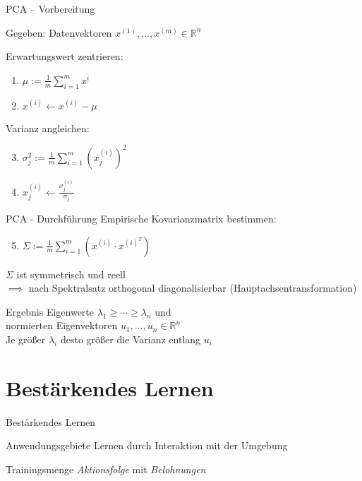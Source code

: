 \documentclass[xcolor={dvipsnames,svgnames}]{beamer}
\begin{document}
\begin{frame}{PCA -- Vorbereitung}

  Gegeben: Datenvektoren $x^{(1)},\ldots,x^{(m)} \in \mathbb{R}^n$
  \vspace{1em}

  Erwartungswert zentrieren:
  
  \begin{enumerate}
  \item $\mu := \frac{1}{m}\sum_{i=1}^m x^{i}$
  \item $x^{(i)} \leftarrow x^{(i)} - \mu$
  \end{enumerate}

  Varianz angleichen:

  \begin{enumerate}
  \setcounter{enumi}{2}
  \item $\sigma_j^2 := \frac{1}{m}\sum_{i=1}^m{(x_j^{(i)})}^2$
  \item $x_j^{(i)} \leftarrow \frac{x_j^{(i)}}{\sigma_j}$
  \end{enumerate}

\end{frame}

\begin{frame}{PCA - Durchführung}
  Empirische Kovarianzmatrix bestimmen:

  \begin{enumerate}
  \setcounter{enumi}{4}
  \item $\Sigma := \frac{1}{m}\sum_{i=1}^m (x^{(i)} \cdot x^{(i)^T})$
  \end{enumerate}

  $\Sigma$ ist symmetrisch und reell \\
  $\implies$ nach Spektralsatz orthogonal diagonalisierbar
  (Hauptachsentransformation)

  \begin{block}{Ergebnis}
    Eigenwerte $\lambda_1 \geq \cdots \geq \lambda_n$ und \\
    normierten Eigenvektoren $u_1,\ldots,u_n \in \mathbb{R}^n$ \\
    Je größer $\lambda_i$ desto größer die Varianz entlang $u_i$
  \end{block}
\end{frame}

\section{Bestärkendes Lernen}

\begin{frame}{Bestärkendes Lernen}

  \begin{exampleblock}{Anwendungsgebiete}
    Lernen durch Interaktion mit der Umgebung
  \end{exampleblock}

  \begin{block}{Trainingsmenge}
    \textit{Aktionsfolge} mit \textit{Belohnungen}
  \end{block}

\end{frame}
\end{document}
